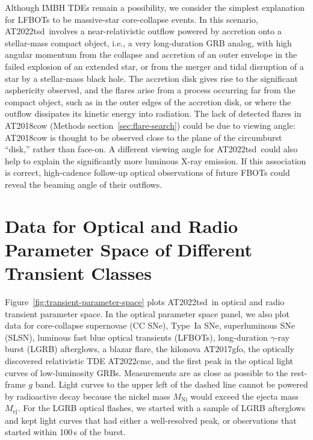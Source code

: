 \documentclass{nature_plusfigure}
\newcommand{\at}{AT2022tsd}
\begin{document}
\begin{methods}
Although IMBH TDEs remain a possibility, we consider the simplest explanation for LFBOTs to be massive-star core-collapse events. In this scenario, \at\ involves a near-relativistic outflow powered by accretion onto a stellar-mass compact object, i.e., a very long-duration GRB analog\cite{Quataert2012}, with high angular momentum from the collapse and accretion of an outer envelope in the failed explosion of an extended star\cite{Perley2021,Metzger2022}, or from the merger and tidal disruption of a star by a stellar-mass black hole\cite{Metzger2022}. The accretion disk gives rise to the significant asphericity observed\cite{Maund2023}, and the flares arise from a process occurring far from the compact object, such as in the outer edges of the accretion disk, or where the outflow dissipates its kinetic energy into radiation. The lack of detected flares in AT2018cow (Methods section~\ref{sec:flare-search}) could be due to viewing angle: AT2018cow is thought to be observed close to the plane of the circumburst ``disk,'' rather than face-on\cite{Margutti2019,Chen2023}. A different viewing angle for \at\ could also help to explain the significantly more luminous X-ray emission.
If this association is correct, high-cadence follow-up optical observations of future FBOTs could reveal the beaming angle of their outflows.

\section{Data for Optical and Radio Parameter Space of Different Transient Classes}
\label{sec:data-transient-parameter-space}

Figure~\ref{fig:transient-parameter-space} plots \at\ in optical and radio transient parameter space.
In the optical parameter space panel, we also plot data for
core-collapse supernovae (CC SNe\cite{PerleyBTS,Ho2022_RET}), Type~Ia SNe\cite{PerleyBTS}, superluminous SNe (SLSN\cite{PerleyBTS}), luminous fast blue optical transients (LFBOTs\cite{Prentice2018,Perley2019,Ho2019,Margutti2019,Perley2021,Ho2020_Koala,Yao2022,Coppejans2020,Ho2022_AT2020xnd,Arcavi2016,Greiner2015,Pursiainen2018}), long-duration $\gamma$-ray burst (LGRB) afterglows\cite{Racusin2008,Kann2010}, 
a blazar flare\cite{Nesci2021}, the kilonova AT2017gfo\cite{Kasliwal2017,Villar2017,Cowperthwaite2017,Drout2017}, the optically discovered relativistic TDE AT2022cmc\cite{Andreoni2022}, and the first peak in the optical light curves of low-luminosity GRBs\cite{Galama1998,Campana2006,DElia2018,Ho2020_SN2020bvc}.
Measurements are as close as possible to the rest-frame $g$ band.
Light curves to the upper left of the dashed line\cite{Kasen2017} cannot be powered by radioactive decay because the nickel mass $M_\mathrm{Ni}$ would exceed the ejecta mass $M_\mathrm{ej}$. For the LGRB optical flashes, we started with a sample of LGRB afterglows\cite{Kann2010} and kept light curves that had either a well-resolved peak, or observations that started within 100\,s of the burst.


\end{methods}
\end{document}
